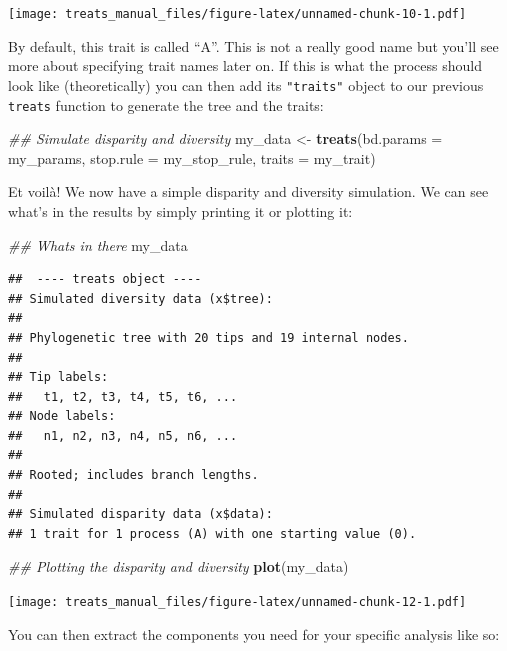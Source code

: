 \documentclass[
]{book}
\newenvironment{Shaded}{\begin{snugshade}}{\end{snugshade}}
\newcommand{\CommentTok}[1]{\textcolor[rgb]{0.56,0.35,0.01}{\textit{#1}}}
\newcommand{\DataTypeTok}[1]{\textcolor[rgb]{0.13,0.29,0.53}{#1}}
\newcommand{\KeywordTok}[1]{\textcolor[rgb]{0.13,0.29,0.53}{\textbf{#1}}}
\newcommand{\NormalTok}[1]{#1}
\newcommand{\StringTok}[1]{\textcolor[rgb]{0.31,0.60,0.02}{#1}}
\begin{document}
\texttt{[image: treats\_manual\_files/figure-latex/unnamed-chunk-10-1.pdf]}

By default, this trait is called ``A''.
This is not a really good name but you'll see more about specifying trait names later on.
If this is what the process should look like (theoretically) you can then add its \texttt{"traits"} object to our previous \texttt{treats} function to generate the tree and the traits:

\begin{Shaded}
\begin{Highlighting}[]
\CommentTok{\#\# Simulate disparity and diversity}
\NormalTok{my\_data \textless{}{-}}\StringTok{ }\KeywordTok{treats}\NormalTok{(}\DataTypeTok{bd.params =}\NormalTok{ my\_params,}
                \DataTypeTok{stop.rule =}\NormalTok{ my\_stop\_rule,}
                \DataTypeTok{traits    =}\NormalTok{ my\_trait)}
\end{Highlighting}
\end{Shaded}

Et voilà! We now have a simple disparity and diversity simulation.
We can see what's in the results by simply printing it or plotting it:

\begin{Shaded}
\begin{Highlighting}[]
\CommentTok{\#\# What\textquotesingle{}s in there}
\NormalTok{my\_data}
\end{Highlighting}
\end{Shaded}

\begin{verbatim}
##  ---- treats object ---- 
## Simulated diversity data (x$tree):
## 
## Phylogenetic tree with 20 tips and 19 internal nodes.
## 
## Tip labels:
##   t1, t2, t3, t4, t5, t6, ...
## Node labels:
##   n1, n2, n3, n4, n5, n6, ...
## 
## Rooted; includes branch lengths.
## 
## Simulated disparity data (x$data):
## 1 trait for 1 process (A) with one starting value (0).
\end{verbatim}

\begin{Shaded}
\begin{Highlighting}[]
\CommentTok{\#\# Plotting the disparity and diversity}
\KeywordTok{plot}\NormalTok{(my\_data)}
\end{Highlighting}
\end{Shaded}

\texttt{[image: treats\_manual\_files/figure-latex/unnamed-chunk-12-1.pdf]}

You can then extract the components you need for your specific analysis like so:
\end{document}
